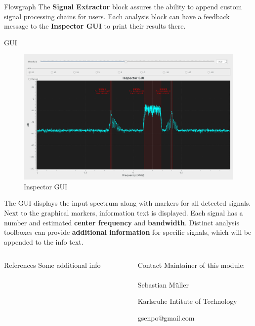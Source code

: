 \documentclass{beamer}
\begin{document}
\begin{frame}
\begin{columns}[t]
\begin{column}{0.66\textwidth}
\begin{block}{Flowgraph}
	      The \textbf{Signal Extractor} block assures the ability to append custom signal processing chains for users. Each analysis block can have a feedback message to the \textbf{Inspector GUI} to print their results there.
      \end{block}
      \begin{block}{GUI}
      \begin{figure}
      	\includegraphics[width=\textwidth]{figures/gui.png}
      	\caption{Inspector GUI}
      \end{figure}
      	The GUI displays the input spectrum along with markers for all detected signals. Next to the graphical markers, information text is displayed. Each signal has a number and estimated \textbf{center frequency} and \textbf{bandwidth}. Distinct analysis toolboxes can provide \textbf{additional information} for specific signals, which will be appended to the info text.
      \end{block}
    \end{column}
  \end{columns}
  \begin{columns}[t]
  	\begin{column}{0.66\textwidth}
  		\begin{block}{References}
  			Some additional info
  		\end{block}
  	\end{column}
  	\begin{column}{0.01\textwidth}
  	\end{column}
  	\begin{column}{0.33\textwidth}
  		\begin{block}{Contact}
  			Maintainer of this module:\\~\\
  			Sebastian Müller

  			Karlsruhe Intitute of Technology

  			gsenpo@gmail.com
  		\end{block}
  	\end{column}
  \end{columns}
\end{frame}
\end{document}
